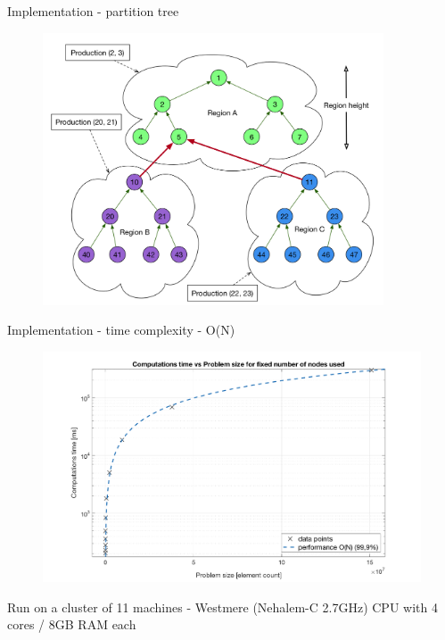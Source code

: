 \documentclass[c]{beamer}
\begin{document}

\begin{frame}{Implementation - partition tree}

   \begin{figure}
      \centering
      \includegraphics[width=0.9\textwidth]{img/graph-idea.png}
    \end{figure}

\end{frame}


\begin{frame}{Implementation - time complexity - O(N)}

\begin{figure}
      \centering
      \includegraphics[width=1\textwidth]{img/TimeVsProblemSizeFixedNodes.png}
    \end{figure}
    
    {\tiny * Run on a cluster of 11 machines - Westmere (Nehalem-C 2.7GHz) CPU with 4 cores / 8GB RAM each}

\end{frame}
\end{document}

